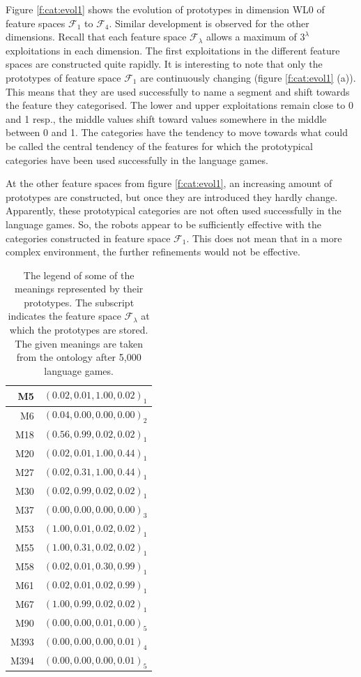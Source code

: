 Figure \ref{f:cat:evol1} shows the evolution of prototypes in dimension WL0 of feature spaces ${\mathcal F}_1$ to ${\mathcal F}_4$. Similar development is observed for the other dimensions. Recall that each feature space ${\mathcal F}_\lambda$ allows a maximum of $3^\lambda$ exploitations in each dimension. The first exploitations in the different feature spaces are constructed quite rapidly. It is interesting to note that only the prototypes of feature space ${\mathcal F}_1$  are continuously changing (figure \ref{f:cat:evol1} (a)). This means that they are used successfully to name a segment and shift towards the feature they categorised. The lower and upper exploitations remain close to 0 and 1 resp., the middle values shift toward values somewhere in the middle between 0 and 1. The categories have the tendency to move towards what could be called the central tendency of the features for which the prototypical categories have been used successfully in the language games. 

At the other feature spaces from figure \ref{f:cat:evol1}, an increasing amount of prototypes are constructed, but once they are introduced they hardly change. Apparently, these prototypical categories are not often used successfully in the language games. So, the robots appear to be sufficiently effective with the categories constructed in feature space ${\mathcal F}_1$. This does not mean that in a more complex environment, the further refinements would not be effective.

\begin{table}
\centering
\begin{tabular}{||r|r||}
\hline\hline
M5 & $(0.02, 0.01, 1.00, 0.02)_1$\\\hline
M6 & $(0.04, 0.00, 0.00, 0.00)_2$\\\hline
M18 & $(0.56, 0.99, 0.02, 0.02)_1$\\\hline
M20 & $(0.02, 0.01, 1.00, 0.44)_1$\\\hline
M27 & $(0.02, 0.31, 1.00, 0.44)_1$\\\hline
M30 & $(0.02, 0.99, 0.02, 0.02)_1$\\\hline
M37 & $(0.00, 0.00, 0.00, 0.00)_3$\\\hline
M53 & $(1.00, 0.01, 0.02, 0.02)_1$\\\hline
M55 & $(1.00, 0.31, 0.02, 0.02)_1$\\\hline
M58 & $(0.02, 0.01, 0.30, 0.99)_1$\\\hline
M61 & $(0.02, 0.01, 0.02, 0.99)_1$\\\hline
M67 & $(1.00, 0.99, 0.02, 0.02)_1$\\\hline
M90 & $(0.00, 0.00, 0.01, 0.00)_5$\\\hline
M393 & $(0.00, 0.00, 0.00, 0.01)_4$\\\hline
M394 & $(0.00, 0.00, 0.00, 0.01)_5$\\\hline
\hline
\end{tabular}
\caption{The legend of some of the meanings represented by their prototypes. The subscript indicates the feature space ${\mathcal F}_\lambda$ at which the prototypes are stored. The given meanings are taken from the ontology after 5,000 language games.}
\label{t:st:legend}
\end{table}


